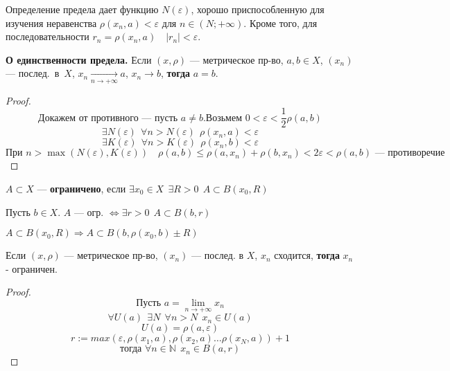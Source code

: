 

\usepackage{bm}




Определение предела дает функцию $N(\varepsilon)$, хорошо приспособленную
для изучения неравенства $\rho(x_n,a)<\varepsilon$ для $n\in(N;+\infty)$.
Кроме того, для последовательности $r_n=\rho(x_n, a) \quad |r_n|<\varepsilon$.

\begin{theorem}
\textbf{О единственности предела.}
Если $(x,\rho)$ --- метрическое пр-во, $a,b\in X$, $(x_n)$ --- послед.~в~$X$,
$x_n\xrightarrow[n\to +\infty]{} a$, $x_n\to b$,
\textbf{тогда} $a=b$.
\end{theorem}

\begin{proof}
$$\text{Докажем от противного --- пусть }a\not =b. \text{Возьмем } 0<\varepsilon<\frac{1}{2}\rho(a,b)$$
$$\exists N(\varepsilon) \ \ \forall n>N(\varepsilon) \ \ \rho(x_n,a)<\varepsilon$$
$$\exists K(\varepsilon) \ \ \forall n>K(\varepsilon) \ \ \rho(x_n,b)<\varepsilon$$
$$\text{При } n>\max(N(\varepsilon),K(\varepsilon)) \quad \rho(a,b)\leq
\rho(a,x_n)+\rho(b,x_n)<2\varepsilon<\rho(a,b) \text{ --- противоречие}$$
\end{proof}

\begin{definition}
$A\subset X$ --- {\bf ограничено}, если $\exists x_0\in X \ \ \exists R>0 \ \ A\subset B(x_0, R)$
\end{definition}

Пусть $b\in X$. $A$ --- огр. $\Leftrightarrow \exists r>0 \ \ A\subset B(b,r)$

$A\subset B(x_0, R)\Rightarrow A\subset B(b,\rho(x_0,b)\pm R)$

\begin{theorem}
Если $(x,\rho)$ --- метрическое пр-во, $(x_n)$ --- послед. в $X$, $x_n$ сходится, \textbf{тогда} $x_n$ - ограничен.
\end{theorem}

\begin{proof}
$$\text{Пусть } a=\lim\limits_{n\to +\infty} x_n$$
$$\forall U(a) \ \ \exists N \ \ \forall n>N \ \ x_n\in U(a)$$
$$U(a)=\rho(a,\varepsilon) $$
$$r:=max(\varepsilon, \rho(x_1, a), \rho(x_2, a) \ldots \rho(x_N, a))+1 $$
$$\text{тогда } \forall n\in\mathbb{N} \ \ x_n\in B(a,r)$$
\end{proof}

